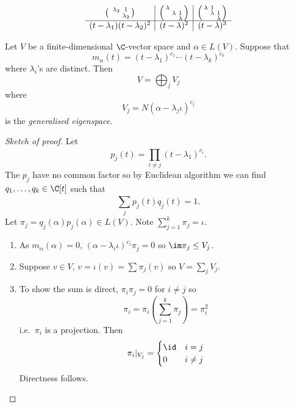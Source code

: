 \documentclass[a4paper]{article}
\theoremstyle{definition}
\begin{document}
\begin{eg}
\begin{enumerate}
\[\begin{array}[h]{c|c|c}
\begin{psmallmatrix}
        & \lambda_2 & 1 \\
        & & \lambda_2
      \end{psmallmatrix}
        &
          \begin{psmallmatrix}
            \lambda & & \\
            & \lambda & 1 \\
            & & \lambda
          \end{psmallmatrix}
        &
          \begin{psmallmatrix}
            \lambda & 1 & \\
            & \lambda & 1 \\
            & & \lambda
          \end{psmallmatrix}
      \\ \hline
      (t - \lambda_1)(t - \lambda_2)^2 & (t - \lambda)^2 & (t - \lambda)^3
    \end{array}
  \]
  \end{enumerate}
\end{eg}

\begin{theorem}
  \label{thm:generalised eigenspace decomposition}
  Let \(V\) be a finite-dimensional \(\C\)-vector space and \(\alpha \in L(V)\). Suppose that
  \[
    m_\alpha(t) = (t - \lambda_1)^{c_1} \cdots (t - \lambda_k)^{c_k}
  \]
  where \(\lambda_i\)'s are distinct. Then
  \[
    V = \bigoplus_j V_j
  \]
  where
  \[
    V_j = N(\alpha - \lambda_j \iota)^{c_j}
  \]
  is the \emph{generalised eigenspace}.
\end{theorem}

\begin{proof}[Sketch of proof]
  Let
  \[
    p_j(t) = \prod_{i \neq j}^{ } (t - \lambda_1)^{c_i}.
  \]
  The \(p_j\) have no common factor so by Euclidean algorithm we can find \(q_1, \dots, q_k \in \C[t]\) such that
  \[
    \sum_{j}^{ } p_j(t)q_j(t) = 1.
  \]
  Let \(\pi_j = q_j(\alpha)p_j(\alpha) \in L(V)\). Note \(\sum_{j = 1}^{k} \pi_j = \iota\).
  \begin{enumerate}
  \item As \(m_\alpha(\alpha) = 0\), \((\alpha - \lambda_i \iota)^{c_j} \pi_j = 0\) so \(\im \pi_j \leq V_j\).
  \item Suppose \(v \in V\), \(v = \iota(v) = \sum \pi_j(v)\) so \(V = \sum_j V_j\).
  \item To show the sum is direct, \(\pi_i \pi_j = 0\) for \(i \neq j\) so
    \[
      \pi_i = \pi_i \left( \sum_{j = 1}^{k} \pi_j \right) = \pi_i^2
    \]
    i.e.\ \(\pi_i\) is a projection. Then
    \[
      \pi_i |_{V_j} =
      \begin{cases}
        \id & i = j \\
        0 & i \neq j
      \end{cases}
    \]
    Directness follows.
  \end{enumerate}
\end{proof}
\end{document}
